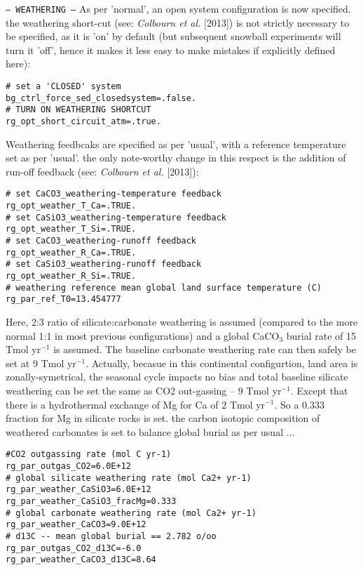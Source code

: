 \documentclass[10pt,twoside]{article}
\begin{document}
\begin{compactitem}
        
        \item \texttt{--- WEATHERING ---}
        As per 'normal', an open system configuration is now specified. the weathering short-cut (see: \textit{Colbourn et al.} [2013]) is not strictly necessary to be specified, as it is 'on' by default (but subsequent snowball experiments will turn it 'off', hence it makes it less easy to make mistakes if explicitly defined here):
                        \vspace{-5pt}\begin{verbatim}
# set a 'CLOSED' system
bg_ctrl_force_sed_closedsystem=.false.
# TURN ON WEATHERING SHORTCUT
rg_opt_short_circuit_atm=.true.
                \end{verbatim}\vspace{-5pt}
                Weathering feedbcaks are specified as per 'usual', with a reference temperature set as per 'usual'. the only note-worthy change in this respect is the addition of run-off feedback (see: \textit{Colbourn et al.} [2013]):
                        \vspace{-5pt}\begin{verbatim}
# set CaCO3_weathering-temperature feedback
rg_opt_weather_T_Ca=.TRUE.
# set CaSiO3_weathering-temperature feedback
rg_opt_weather_T_Si=.TRUE.
# set CaCO3_weathering-runoff feedback
rg_opt_weather_R_Ca=.TRUE.
# set CaSiO3_weathering-runoff feedback
rg_opt_weather_R_Si=.TRUE.
# weathering reference mean global land surface temperature (C)
rg_par_ref_T0=13.454777
                \end{verbatim}\vspace{-5pt}
        Here, 2:3 ratio of silicate:carbonate weathering is assumed (compared to the more normal 1:1 in most previous configurations) and a global CaCO$_{3}$ burial rate of 15 Tmol yr$^{-1}$ is assumed. The baseline carbonate weathering rate can then safely be set at 9 Tmol yr$^{-1}$. Actually, becasue in this continental configurtion, land area is zonally-symetrical, the seasonal cycle impacts no bias and total baseline silicate weathering can be set the same as CO2 out-gassing -- 9 Tmol yr$^{-1}$. Except that there is a hydrothermal exchange of Mg for Ca of 2 Tmol yr$^{-1}$. So a 0.333 fraction for Mg in silicate rocks is set. the carbon isotopic composition of weathered carbonates is set to balance global burial as per usual ...
                        \vspace{-5pt}\begin{verbatim}
#CO2 outgassing rate (mol C yr-1)
rg_par_outgas_CO2=6.0E+12
# global silicate weathering rate (mol Ca2+ yr-1)
rg_par_weather_CaSiO3=6.0E+12
rg_par_weather_CaSiO3_fracMg=0.333
# global carbonate weathering rate (mol Ca2+ yr-1)
rg_par_weather_CaCO3=9.0E+12
# d13C -- mean global burial == 2.782 o/oo
rg_par_outgas_CO2_d13C=-6.0
rg_par_weather_CaCO3_d13C=8.64
                \end{verbatim}\vspace{-5pt}
        

\end{compactitem}
\end{document}
